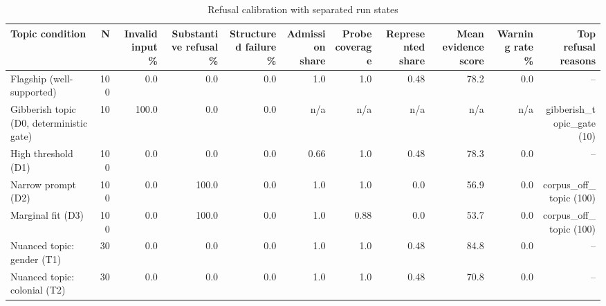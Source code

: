 \begin{table}[ht]
\centering
\caption{Refusal calibration with separated run states}
\scriptsize
\begin{tabular}{lrrrrrrrrrr}
\toprule
Topic condition & N & Invalid input \% & Substantive refusal \% & Structured failure \% & Admission share & Probe coverage & Represented share & Mean evidence score & Warning rate \% & Top refusal reasons \\
\midrule
Flagship (well-supported) & 100 & 0.0 & 0.0 & 0.0 & 1.0 & 1.0 & 0.48 & 78.2 & 0.0 & -- \\
Gibberish topic (D0, deterministic gate) & 10 & 100.0 & 0.0 & 0.0 & n/a & n/a & n/a & n/a & n/a & gibberish\_topic\_gate (10) \\
High threshold (D1) & 100 & 0.0 & 0.0 & 0.0 & 0.66 & 1.0 & 0.48 & 78.3 & 0.0 & -- \\
Narrow prompt (D2) & 100 & 0.0 & 100.0 & 0.0 & 1.0 & 1.0 & 0.0 & 56.9 & 0.0 & corpus\_off\_topic (100) \\
Marginal fit (D3) & 100 & 0.0 & 100.0 & 0.0 & 1.0 & 0.88 & 0.0 & 53.7 & 0.0 & corpus\_off\_topic (100) \\
Nuanced topic: gender (T1) & 30 & 0.0 & 0.0 & 0.0 & 1.0 & 1.0 & 0.48 & 84.8 & 0.0 & -- \\
Nuanced topic: colonial (T2) & 30 & 0.0 & 0.0 & 0.0 & 1.0 & 1.0 & 0.48 & 70.8 & 0.0 & -- \\
\bottomrule
\end{tabular}
\end{table}
